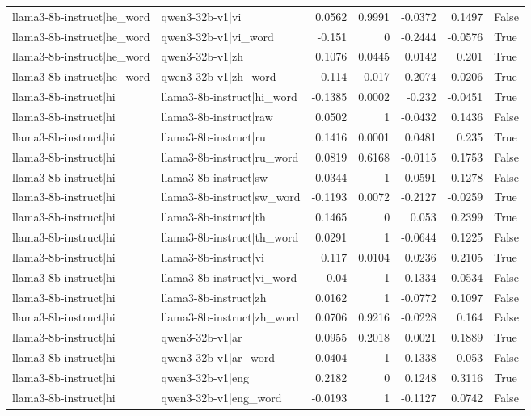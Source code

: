 \begin{table}
\begin{tabular}{l l r r r r l}
llama3-8b-instruct|he_word & qwen3-32b-v1|vi & 0.0562 & 0.9991 & -0.0372 & 0.1497 & False \\
llama3-8b-instruct|he_word & qwen3-32b-v1|vi_word & -0.151 & 0 & -0.2444 & -0.0576 & True \\
llama3-8b-instruct|he_word & qwen3-32b-v1|zh & 0.1076 & 0.0445 & 0.0142 & 0.201 & True \\
llama3-8b-instruct|he_word & qwen3-32b-v1|zh_word & -0.114 & 0.017 & -0.2074 & -0.0206 & True \\
llama3-8b-instruct|hi & llama3-8b-instruct|hi_word & -0.1385 & 0.0002 & -0.232 & -0.0451 & True \\
llama3-8b-instruct|hi & llama3-8b-instruct|raw & 0.0502 & 1 & -0.0432 & 0.1436 & False \\
llama3-8b-instruct|hi & llama3-8b-instruct|ru & 0.1416 & 0.0001 & 0.0481 & 0.235 & True \\
llama3-8b-instruct|hi & llama3-8b-instruct|ru_word & 0.0819 & 0.6168 & -0.0115 & 0.1753 & False \\
llama3-8b-instruct|hi & llama3-8b-instruct|sw & 0.0344 & 1 & -0.0591 & 0.1278 & False \\
llama3-8b-instruct|hi & llama3-8b-instruct|sw_word & -0.1193 & 0.0072 & -0.2127 & -0.0259 & True \\
llama3-8b-instruct|hi & llama3-8b-instruct|th & 0.1465 & 0 & 0.053 & 0.2399 & True \\
llama3-8b-instruct|hi & llama3-8b-instruct|th_word & 0.0291 & 1 & -0.0644 & 0.1225 & False \\
llama3-8b-instruct|hi & llama3-8b-instruct|vi & 0.117 & 0.0104 & 0.0236 & 0.2105 & True \\
llama3-8b-instruct|hi & llama3-8b-instruct|vi_word & -0.04 & 1 & -0.1334 & 0.0534 & False \\
llama3-8b-instruct|hi & llama3-8b-instruct|zh & 0.0162 & 1 & -0.0772 & 0.1097 & False \\
llama3-8b-instruct|hi & llama3-8b-instruct|zh_word & 0.0706 & 0.9216 & -0.0228 & 0.164 & False \\
llama3-8b-instruct|hi & qwen3-32b-v1|ar & 0.0955 & 0.2018 & 0.0021 & 0.1889 & True \\
llama3-8b-instruct|hi & qwen3-32b-v1|ar_word & -0.0404 & 1 & -0.1338 & 0.053 & False \\
llama3-8b-instruct|hi & qwen3-32b-v1|eng & 0.2182 & 0 & 0.1248 & 0.3116 & True \\
llama3-8b-instruct|hi & qwen3-32b-v1|eng_word & -0.0193 & 1 & -0.1127 & 0.0742 & False \\

\end{tabular}
\end{table}
